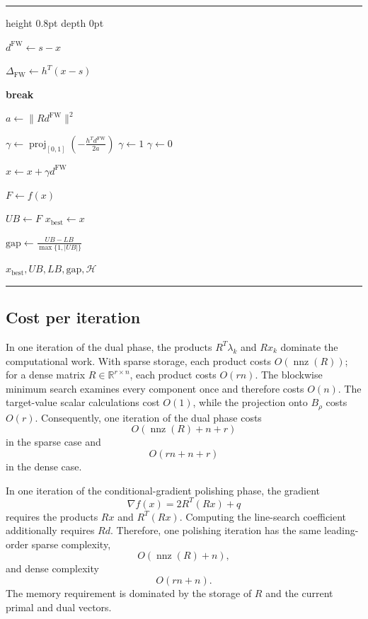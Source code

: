 \documentclass[12pt]{article}
\makeatletter
\newenvironment{breakablealgorithm}
{%
  \par
  \addvspace{\topsep}
  \refstepcounter{algorithm}%
  \hrule height 0.8pt depth 0pt
  \kern 2pt
  \renewcommand{\caption}[2][\relax]{%
    {\raggedright
     \textbf{\ALG@name~\thealgorithm}\ ##2\par}%
    \ifx\relax##1\relax
      \addcontentsline{loa}{algorithm}
      {\protect\numberline{\thealgorithm}##2}%
    \else
      \addcontentsline{loa}{algorithm}
      {\protect\numberline{\thealgorithm}##1}%
    \fi
    \kern 2pt
    \hrule
    \kern 2pt
  }%
}
{%
  \kern 2pt
  \hrule
  \par
  \addvspace{\topsep}
}
\newcommand{\R}{\mathbb{R}}
\DeclareMathOperator{\nnz}{nnz}
\DeclareMathOperator{\proj}{proj}
\makeatother
\begin{document}
\begin{breakablealgorithm}
\begin{algorithmic}
    \State $d^{\mathrm{FW}}\gets s-x$

    \State
    $\Delta_{\mathrm{FW}}
    \gets
    h^T(x-s)$

        \State \textbf{break}
    \EndIf

    \State
    $a\gets\|Rd^{\mathrm{FW}}\|^2$

        \State
        $\displaystyle
        \gamma
        \gets
        \proj_{[0,1]}
        \left(
        -\frac{h^Td^{\mathrm{FW}}}{2a}
        \right)$
    \Else
            \State $\gamma\gets1$
        \Else
            \State $\gamma\gets0$
        \EndIf
    \EndIf

    \State
    $x\gets x+\gamma d^{\mathrm{FW}}$

    \State
    $F\gets f(x)$

        \State $UB\gets F$
        \State $x_{\mathrm{best}}\gets x$
    \EndIf

\EndFor

\State
$\displaystyle
\mathrm{gap}
\gets
\frac{UB-LB}{\max\{1,|UB|\}}$

\State
\Return
$x_{\mathrm{best}},UB,LB,\mathrm{gap},\mathcal H$

\end{algorithmic}
\end{breakablealgorithm}

\subsection{Cost per iteration}

In one iteration of the dual phase, the products
$R^T\lambda_k$ and $Rx_k$ dominate the computational work. With
sparse storage, each product costs $O(\nnz(R))$; for a dense matrix
$R\in\R^{r\times n}$, each product costs $O(rn)$. The blockwise
minimum search examines every component once and therefore costs
$O(n)$. The target-value scalar calculations cost $O(1)$, while the
projection onto $B_\rho$ costs $O(r)$. Consequently, one iteration
of the dual phase costs
\begin{equation}
O(\nnz(R)+n+r)
\label{eq:sparse-cost}
\end{equation}
in the sparse case and
\[
O(rn+n+r)
\]
in the dense case.

In one iteration of the conditional-gradient polishing phase, the
gradient
\[
\nabla f(x)=2R^T(Rx)+q
\]
requires the products $Rx$ and $R^T(Rx)$. Computing the line-search
coefficient additionally requires $Rd$. Therefore, one polishing
iteration has the same leading-order sparse complexity,
\[
O(\nnz(R)+n),
\]
and dense complexity
\[
O(rn+n).
\]
The memory requirement is dominated by the storage of $R$ and the
current primal and dual vectors.
\end{document}
